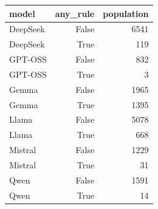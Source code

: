 \begin{tabular}{lrr}
\toprule
model & any\_rule & population \\
\midrule
DeepSeek & False & 6541 \\
DeepSeek & True & 119 \\
GPT-OSS & False & 832 \\
GPT-OSS & True & 3 \\
Gemma & False & 1965 \\
Gemma & True & 1395 \\
Llama & False & 5078 \\
Llama & True & 668 \\
Mistral & False & 1229 \\
Mistral & True & 31 \\
Qwen & False & 1591 \\
Qwen & True & 14 \\
\bottomrule
\end{tabular}

